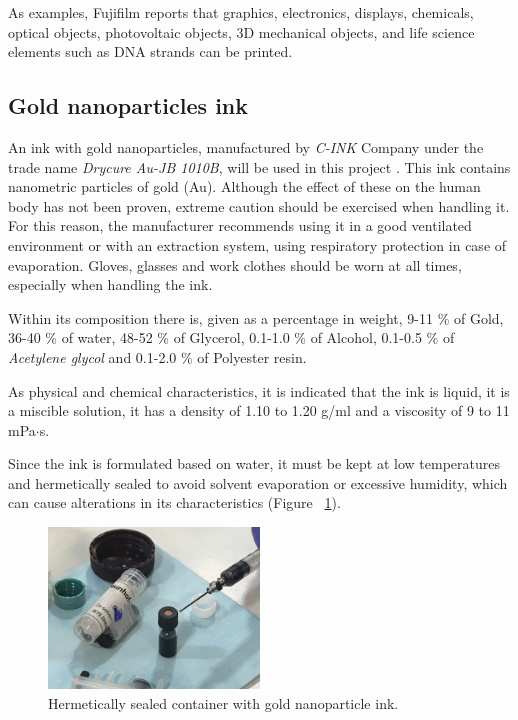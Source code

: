 As examples, Fujifilm reports that graphics, electronics, displays, chemicals, optical objects, photovoltaic objects, 3D mechanical objects, and life science elements such as DNA strands can be printed.

\subsection{Gold nanoparticles ink}
An ink with gold nanoparticles, manufactured by \textit{C-INK} Company under the trade name \textit{Drycure Au-JB 1010B}, will be used in this project  \cite{DrycureAu}. This ink contains nanometric particles of gold (Au). Although the effect of these on the human body has not been proven, extreme caution should be exercised when handling it. For this reason, the manufacturer recommends using it in a good ventilated environment or with an extraction system, using respiratory protection in case of evaporation. Gloves, glasses and work clothes should be worn at all times, especially when handling the ink.

Within its composition there is, given as a percentage in weight, 9-11 \% of Gold, 36-40 \% of water, 48-52 \% of Glycerol, 0.1-1.0 \% of Alcohol, 0.1-0.5 \% of \textit{Acetylene glycol} and 0.1-2.0 \% of Polyester resin.

As physical and chemical characteristics, it is indicated that the ink is liquid, it is a miscible solution, it has a density of 1.10 to 1.20 g/ml and a viscosity of 9 to 11 mPa$\cdot$s.

Since the ink is formulated based on water, it must be kept at low temperatures and hermetically sealed to avoid solvent evaporation or excessive humidity, which can cause alterations in its characteristics (Figure ~\ref{fig:Figura_tinta_Au}).

\begin{figure}[H]
  \centering
    \includegraphics[width=0.5\textwidth]{Figures/Figura_tinta_Au}
  \caption{Hermetically sealed container with gold nanoparticle ink.}
  \label{fig:Figura_tinta_Au}
\end{figure}


